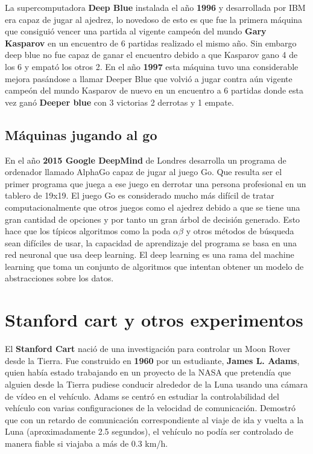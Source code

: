 \documentclass[a4paper, 11pt]{article} %
\begin{document}
La supercomputadora \textbf{Deep Blue} instalada el año \textbf{1996} y desarrollada por IBM era capaz de jugar al ajedrez, lo novedoso de esto es que fue la primera máquina que consiguió vencer una partida al vigente campeón del mundo \textbf{Gary Kasparov} en un encuentro de 6 partidas realizado el mismo año. Sin embargo deep blue no fue capaz de ganar el encuentro debido a que Kasparov gano 4 de los 6 y empató los otros 2. En el año \textbf{1997} esta máquina tuvo una considerable mejora pasándose a llamar Deeper Blue que volvió a jugar contra aún vigente campeón del mundo Kasparov de nuevo en un encuentro a 6 partidas donde esta vez ganó \textbf{Deeper blue} con 3 victorias 2 derrotas y 1 empate.

\subsection{Máquinas jugando al go}

En el año \textbf{2015 Google DeepMind} de Londres desarrolla un programa de ordenador llamado AlphaGo capaz de jugar al juego Go. Que resulta ser el primer programa que juega a ese juego en derrotar una persona profesional en un tablero de 19x19. El juego Go es considerado mucho más difícil de tratar computacionalmente que otros juegos como el ajedrez debido a que se tiene una gran cantidad de opciones y por tanto un gran árbol de decisión generado. Esto hace que los típicos algoritmos como la poda $\alpha\beta$ y otros métodos de búsqueda sean difíciles de usar, la capacidad de aprendizaje del programa se basa en una red neuronal que usa deep learning. El deep learning es una rama del machine learning que toma un conjunto de algoritmos que intentan obtener un modelo de abstracciones sobre los datos.

\section{Stanford cart y otros experimentos}
El \textbf{Stanford Cart} nació de una investigación para controlar un Moon Rover desde la Tierra. Fue construido en \textbf{1960} por un estudiante, \textbf{James L. Adams}, quien había estado trabajando en un proyecto de la NASA que pretendía que alguien desde la Tierra pudiese conducir alrededor de la Luna usando una cámara de vídeo en el vehículo.
Adams se centró en estudiar la controlabilidad del vehículo con varias configuraciones de la velocidad de comunicación. Demostró que con un retardo de comunicación correspondiente al viaje de ida y vuelta a la Luna (aproximadamente 2.5 segundos), el vehículo no podía ser controlado de manera fiable si viajaba a más de 0.3 km/h.
\end{document}
